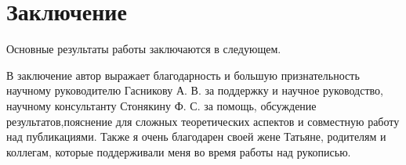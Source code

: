\chapter*{Заключение}                       %


Основные результаты работы заключаются в следующем.


В заключение автор выражает благодарность и большую признательность научному руководителю Гасникову А. В. за поддержку и научное руководство, научному консультанту Стонякину Ф. С. за помощь, обсуждение результатов,пояснение для сложных теоретических аспектов и совместную работу над публикациями. Также я очень благодарен своей жене Татьяне, родителям и коллегам, которые поддерживали меня во время работы над рукописью. 